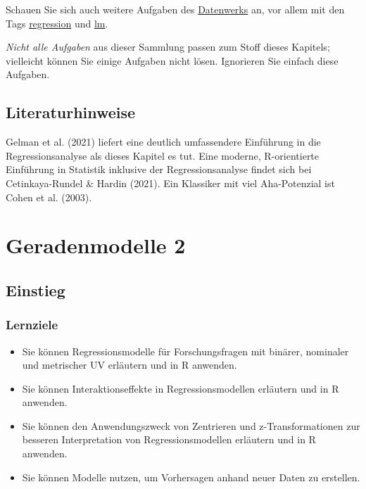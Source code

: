 \documentclass[
  letterpaper,
  oneside,
  open=any]{scrbook}
\providecommand{\tightlist}{%
  \setlength{\itemsep}{0pt}\setlength{\parskip}{0pt}}\usepackage{longtable,booktabs,array}
\theoremstyle{definition}
\theoremstyle{definition}
\theoremstyle{definition}
\theoremstyle{remark}
\begin{document}
Schauen Sie sich auch weitere Aufgaben des
\href{https://sebastiansauer.github.io/Datenwerk/}{Datenwerks} an, vor
allem mit den Tags
\href{https://sebastiansauer.github.io/Datenwerk/\#category=regression}{regression}
und \href{https://sebastiansauer.github.io/Datenwerk/\#category=lm}{lm}.

\emph{Nicht alle Aufgaben} aus dieser Sammlung passen zum Stoff dieses
Kapitels; vielleicht können Sie einige Aufgaben nicht lösen. Ignorieren
Sie einfach diese Aufgaben.

\section{Literaturhinweise}\label{literaturhinweise-7}

Gelman et al. (2021) liefert eine deutlich umfassendere Einführung in
die Regressionsanalyse als dieses Kapitel es tut. Eine moderne,
R-orientierte Einführung in Statistik inklusive der Regressionsanalyse
findet sich bei Cetinkaya-Rundel \& Hardin (2021). Ein Klassiker mit
viel Aha-Potenzial ist Cohen et al. (2003).

\chapter{Geradenmodelle 2}\label{geradenmodelle-2}

\section{Einstieg}\label{einstieg-9}

\subsection{Lernziele}\label{lernziele-9}

\begin{itemize}
\tightlist
\item
  Sie können Regressionsmodelle für Forschungsfragen mit binärer,
  nominaler und metrischer UV erläutern und in R anwenden.
\item
  Sie können Interaktionseffekte in Regressionsmodellen erläutern und in
  R anwenden.
\item
  Sie können den Anwendungszweck von Zentrieren und z-Transformationen
  zur besseren Interpretation von Regressionsmodellen erläutern und in R
  anwenden.
\item
  Sie können Modelle nutzen, um Vorhersagen anhand neuer Daten zu
  erstellen.
\end{itemize}
\end{document}
